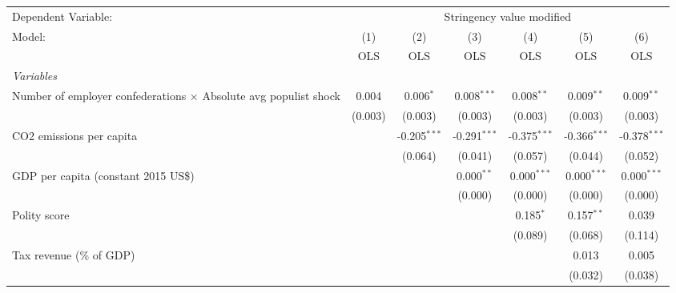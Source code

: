 
\begingroup
\centering
\begin{tabular}{lcccccc}
   \toprule
   Dependent Variable: & \multicolumn{6}{c}{Stringency value modified}\\
   Model:                                                                  & (1)     & (2)            & (3)            & (4)            & (5)            & (6)\\  
                                                                           &  OLS    & OLS            & OLS            & OLS            & OLS            & OLS\\  
   \midrule
   \emph{Variables}\\
   Number of employer confederations $\times$ Absolute avg populist shock  & 0.004   & 0.006$^{*}$    & 0.008$^{***}$  & 0.008$^{**}$   & 0.009$^{**}$   & 0.009$^{**}$\\   
                                                                           & (0.003) & (0.003)        & (0.003)        & (0.003)        & (0.003)        & (0.003)\\   
   CO2 emissions per capita                                                &         & -0.205$^{***}$ & -0.291$^{***}$ & -0.375$^{***}$ & -0.366$^{***}$ & -0.378$^{***}$\\   
                                                                           &         & (0.064)        & (0.041)        & (0.057)        & (0.044)        & (0.052)\\   
   GDP per capita (constant 2015 US\$)                                     &         &                & 0.000$^{**}$   & 0.000$^{***}$  & 0.000$^{***}$  & 0.000$^{***}$\\   
                                                                           &         &                & (0.000)        & (0.000)        & (0.000)        & (0.000)\\   
   Polity score                                                            &         &                &                & 0.185$^{*}$    & 0.157$^{**}$   & 0.039\\   
                                                                           &         &                &                & (0.089)        & (0.068)        & (0.114)\\   
   Tax revenue (\% of GDP)                                                 &         &                &                &                & 0.013          & 0.005\\   
                                                                           &         &                &                &                & (0.032)        & (0.038)\\   

\end{tabular}

